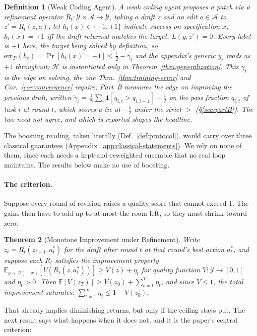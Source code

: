 \documentclass{article}
\newtheorem{theorem}{Theorem}
\newtheorem{definition}[theorem]{Definition}
\theoremstyle{remark}
\theoremstyle{plain}
\newcommand{\Y}{\mathcal{Y}}
\newcommand{\D}{\mathcal{D}}
\newcommand{\Hyp}{\mathcal{H}}
\begin{document}
\begin{definition}[Weak Coding Agent]
\label{def:weak-agent}
A \emph{weak coding agent} proposes a patch via a \emph{refinement operator} $R_t:\Y\times\mathcal{A}\to\Y$, taking a draft $z$ and an edit $a\in\mathcal{A}$ to $z'=R_t(z,a)$; let $h_t(x)\in\{-1,+1\}$ indicate success on specification $x$, $h_t(x)=+1$ iff the draft returned matches the target, $L(y,z')=0$. Every label is $+1$ here, the target being solved by definition, so $\mathrm{err}_{\D}(h_t)=\Pr[h_t(x)={-}1]\le\tfrac12-\gamma_t$ and the appendix's generic $y_i$ reads as $+1$ throughout; $\Hyp$ is instantiated only in Theorem~\ref{thm:generalization}. This $\gamma_t$ is the edge on \emph{solving}, the one Thm.~\ref{thm:training-error} and Cor.~\ref{cor:convergence} require; Part~B measures the edge on \emph{improving} the previous draft, written $\tilde\gamma_t=\tfrac1N\sum_i\mathbf1[q_{i,t}>q_{i,t-1}]-\tfrac12$ on the pass fraction $q_{i,t}$ of task $i$ at round $t$, which scores a tie at ${-}\tfrac12$ under the strict $>$ (\S\ref{sec:partB}). The two need not agree, and which is reported shapes the headline.
\end{definition}

The boosting reading, taken literally (Def.~\ref{def:protocol}), would carry over three classical guarantees (Appendix~\ref{app:classical-statements}). We rely on none of them, since each needs a kept-and-reweighted ensemble that no real loop maintains. The results below make no use of boosting.

\paragraph{The criterion.} Suppose every round of revision raises a quality score that cannot exceed 1. The gains then have to add up to at most the room left, so they must shrink toward zero:

\begin{theorem}[Monotone Improvement under Refinement]
\label{thm:refinement}
Write $z_t=R_t(z_{t-1},a_t^*)$ for the draft after round $t$ at that round's best action $a_t^*$, and suppose each $R_t$ satisfies the improvement property $\mathbb{E}_{y\sim\D(\cdot\mid x)}[V(R_t(z,a_t^*))]\ge V(z)+\eta_t$ for quality function $V:\Y\to[0,1]$ and $\eta_t>0$. Then $\mathbb{E}[V(z_T)]\ge V(z_0)+\sum_{t=1}^T\eta_t$, and since $V\le1$, the total improvement saturates: $\sum_{t=1}^\infty\eta_t\le1-V(z_0)$.
\end{theorem}

That already implies diminishing returns, but only if the ceiling stays put. The next result says what happens when it does not, and it is the paper's central criterion:
\end{document}
